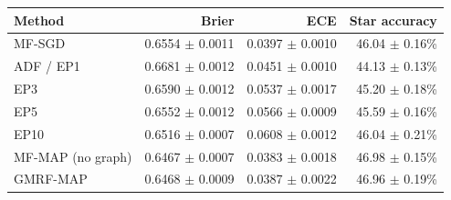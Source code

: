 \begin{tabular}{@{}lrrr@{}}\toprule
Method & Brier & ECE & Star accuracy\\\midrule
MF-SGD & 0.6554 $\pm$ 0.0011 & 0.0397 $\pm$ 0.0010 & 46.04 $\pm$ 0.16\%\\
ADF / EP1 & 0.6681 $\pm$ 0.0012 & 0.0451 $\pm$ 0.0010 & 44.13 $\pm$ 0.13\%\\
EP3 & 0.6590 $\pm$ 0.0012 & 0.0537 $\pm$ 0.0017 & 45.20 $\pm$ 0.18\%\\
EP5 & 0.6552 $\pm$ 0.0012 & 0.0566 $\pm$ 0.0009 & 45.59 $\pm$ 0.16\%\\
EP10 & 0.6516 $\pm$ 0.0007 & 0.0608 $\pm$ 0.0012 & 46.04 $\pm$ 0.21\%\\
MF-MAP (no graph) & 0.6467 $\pm$ 0.0007 & 0.0383 $\pm$ 0.0018 & 46.98 $\pm$ 0.15\%\\
GMRF-MAP & 0.6468 $\pm$ 0.0009 & 0.0387 $\pm$ 0.0022 & 46.96 $\pm$ 0.19\%\\
\bottomrule\end{tabular}
